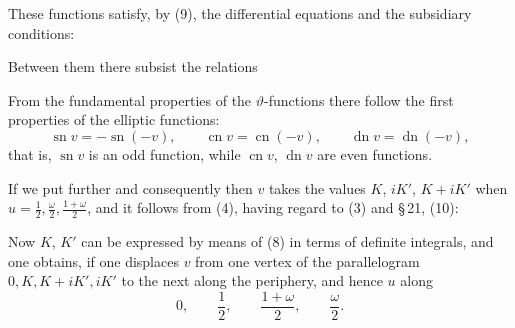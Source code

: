 
These functions satisfy, by (9), the differential equations
and the subsidiary conditions:

Between them there subsist the relations

From the fundamental properties of the $\vartheta$-functions there follow
the first properties of the elliptic functions:
\[
\operatorname{sn}v = -\operatorname{sn}(-v), \qquad \operatorname{cn}v = \operatorname{cn}(-v), \qquad \operatorname{dn}v = \operatorname{dn}(-v),
\]
that is, $\operatorname{sn}v$ is an odd function, while $\operatorname{cn}v$, $\operatorname{dn}v$ are even functions.

If we put further
and consequently
then $v$ takes the values $K$, $iK'$, $K+iK'$ when $u = \frac{1}{2}, \frac{\omega}{2}, \frac{1+\omega}{2}$, and it follows from (4), having regard to (3) and \S\,21, (10):

Now $K$, $K'$ can be expressed by means of (8) in terms of definite
integrals, and one obtains, if one displaces $v$ from one vertex of the
parallelogram $0, K, K+iK', iK'$ to the next along the periphery, and
hence $u$ along
\[
0, \qquad \frac{1}{2}, \qquad \frac{1+\omega}{2}, \qquad \frac{\omega}{2}.
\]
